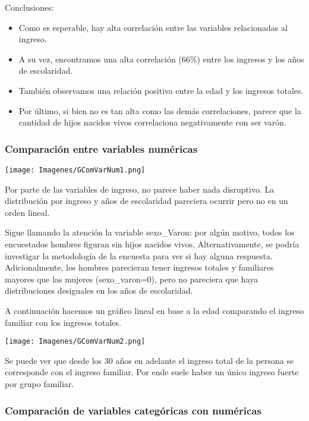 \documentclass[a4paper]{article}
\begin{document}
    Conclusiones:
    \begin{itemize}
        \item Como es esperable, hay alta correlación entre las variables relacionadas al ingreso.
        \item A su vez, encontramos una alta correlación (66\%) entre los ingresos y los años de escolaridad.
        \item También observamos una relación positiva entre la edad y los ingresos totales.
        \item Por último, si bien no es tan alta como las demás correlaciones, parece que la cantidad de hijos nacidos vivos correlaciona negativamente con ser varón.
    \end{itemize}

        \subsubsection{Comparación entre variables numéricas}
        
        \texttt{[image: Imagenes/GComVarNum1.png]}

        Por parte de las variables de ingreso, no parece haber nada disruptivo. La distribución por ingreso y años de escolaridad pareciera ocurrir pero no en un orden lineal.

        Sigue llamando la atención la variable sexo\_Varon: por algún motivo, todos los encuestados hombres figuran sin hijos nacidos vivos. Alternativamente, se podría investigar la metodología de la encuesta para ver si hay alguna respuesta. Adicionalmente, los hombres parecieran tener ingresos totales y familiares mayores que las mujeres (sexo\_varon=0), pero no pareciera que haya distribuciones desiguales en los años de escolaridad.

        A continuación hacemos un gráfico lineal en base a la edad comparando el ingreso familiar con los ingresos totales. 

        \texttt{[image: Imagenes/GComVarNum2.png]}

        Se puede ver que desde los 30 años en adelante el ingreso total de la persona se corresponde con el ingreso familiar. Por ende suele haber un único ingreso fuerte por grupo familiar.

        \newpage

        \subsubsection{Comparación de variables categóricas con numéricas}
        
\end{document}
